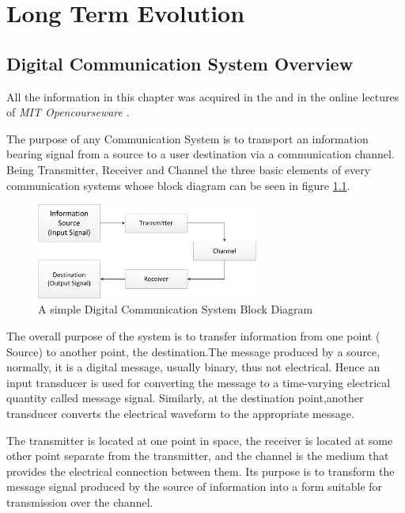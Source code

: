 \chapter{Long Term Evolution}
\label{chap:lte}

\section{Digital Communication System Overview}
\label{lte:digicomm}

All the information in this chapter was acquired in the \cite{sklar2001} and in the
online lectures of \textit{MIT Opencourseware} \cite{ocw:digicomm}.

The purpose of any Communication System is to transport an information bearing
signal from a source to a user destination via a communication channel. Being
Transmitter, Receiver and Channel the three basic elements of every
communication systems whose block diagram can be seen in figure
\ref{fig:digicomsimple}.

\begin{figure}[htbp]
    \centering
    \includegraphics[width=0.65\textwidth]{./figures/digicom_simple}
    \caption{ A simple Digital Communication System Block Diagram
    \label{fig:digicomsimple}}
\end{figure}

The overall purpose of the system is to transfer information from one point (
Source) to another point, the destination.The message produced by a source,
normally, it is a digital message, usually binary, thus not electrical. Hence an
input transducer is used for converting the message to a time-varying electrical
quantity called message signal. Similarly, at the destination point,another
transducer converts the electrical waveform to the appropriate message.

The transmitter is located at one point in space, the receiver is located at
some other point separate from the transmitter, and the channel is the medium
that provides the electrical connection between them. Its purpose is to
transform the message signal produced by the source of information into a form
suitable for transmission over the channel.

